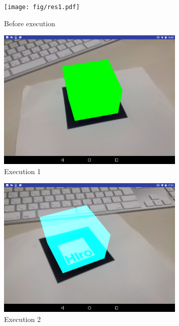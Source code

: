 \begin{figure}[tb]
\centering
\texttt{[image: fig/res1.pdf]}
\caption{Before execution}
\label{fig:res1}
\end{figure}
\begin{figure}[tb]
\centering
\includegraphics[width=9cm]{fig/res2.pdf}
\caption{Execution 1}
\label{fig:res2}
\end{figure}
\begin{figure}[tb]
\centering
\includegraphics[width=9cm]{fig/res3.pdf}
\caption{Execution 2}
\label{fig:res3}
\end{figure}
\ 
\newpage